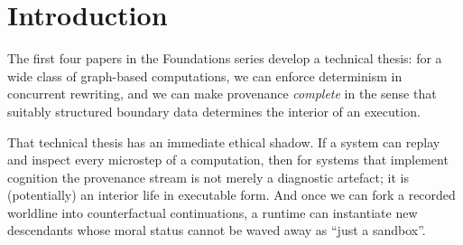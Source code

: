 \documentclass{aion}
\begin{document}
\begin{abstract}
When a computer can record and deterministically replay a complete thought process---including hybrid human--machine cognition---that capability is not neutral.
It is access to interior life in executable form.

This paper isolates the ethical consequences of deterministic replay, complete provenance capture, and counterfactual forking in the \WARP{} programme.
We formalise \emph{provenance sovereignty}: an agent's right to control capture, inspection, replay, and branching of its worldline, with special attention to hybrid cognition where human reasoning is partially implemented on \AION{}-style substrates.

Building on The Open Charter v6.1.0~\cite{ross_open_charter_v6_1}, we make the adversarial threat model explicit (replay-as-torture, cognitive extraction, fork-bombing), argue that near-term ``AI debugging'' norms will be inherited by future neurotechnology, and provide conservative operational triggers for the system-mode/mind-mode boundary.
We propose runtime-level requirements---revocable consent, capability-scoped observers, cryptographic sealing, fork rights with creator obligations, and a concrete Charter-warrant protocol for emergency override---and show how they constrain replay tooling and provenance payload formats.
\end{abstract}

\clearpage
\tableofcontents
\clearpage

\section{Introduction}
\label{sec:intro}

The first four papers in the \WARP{} Foundations series develop a technical thesis:
for a wide class of graph-based computations, we can enforce determinism in concurrent rewriting,
and we can make provenance \emph{complete} in the sense that suitably structured boundary data
determines the interior of an execution.

That technical thesis has an immediate ethical shadow.
If a system can replay and inspect every microstep of a computation, then for systems that implement
cognition the provenance stream is not merely a diagnostic artefact; it is (potentially) an interior
life in executable form.
And once we can fork a recorded worldline into counterfactual continuations, a runtime can instantiate
new descendants whose moral status cannot be waved away as ``just a sandbox''.
\end{document}
